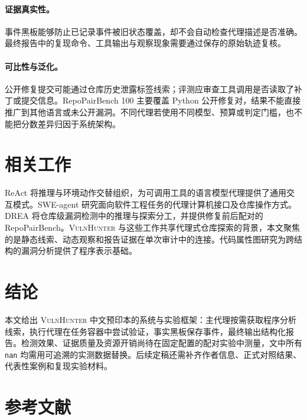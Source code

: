 \documentclass[times,twoside,watermark]{zHenriquesLab-StyleBioRxiv}
\newcommand{\VH}{\textsc{VulnHunter}}
\newcommand{\nan}{\texttt{nan}}
\begin{document}
\paragraph{证据真实性。} 事件黑板能够防止已记录事件被旧状态覆盖，却不会自动检查代理描述是否准确。最终报告中的复现命令、工具输出与观察现象需要通过保存的原始轨迹复核。

\paragraph{可比性与泛化。} 公开修复提交可能通过仓库历史泄露标签线索；评测应审查工具调用是否读取了补丁或提交信息。RepoPairBench 100 主要覆盖 Python 公开修复对，结果不能直接推广到其他语言或未公开漏洞。不同代理若使用不同模型、预算或判定门槛，也不能把分数差异归因于系统架构。

\section*{相关工作}
ReAct 将推理与环境动作交替组织，为可调用工具的语言模型代理提供了通用交互模式\cite{react2023}。SWE-agent 研究面向软件工程任务的代理计算机接口及仓库操作方式\cite{sweagent2024}。DREA 将仓库级漏洞检测中的推理与探索分工，并提供修复前后配对的 RepoPairBench\cite{drea2026}。\VH{} 与这些工作共享代理式仓库探索的背景，本文聚焦的是静态线索、动态观察和报告证据在单次审计中的连接。代码属性图研究为跨结构的漏洞分析提供了程序表示基础\cite{cpg2014}。

\section*{结论}
本文给出 \VH{} 中文预印本的系统与实验框架：主代理按需获取程序分析线索，执行代理在任务容器中尝试验证，事实黑板保存事件，最终输出结构化报告。检测效果、证据质量及资源开销尚待在固定配置的配对实验中测量，文中所有 \nan{} 均需用可追溯的实测数据替换。后续定稿还需补齐作者信息、正式对照结果、代表性案例和复现实验材料。

\section*{参考文献}

\end{document}
